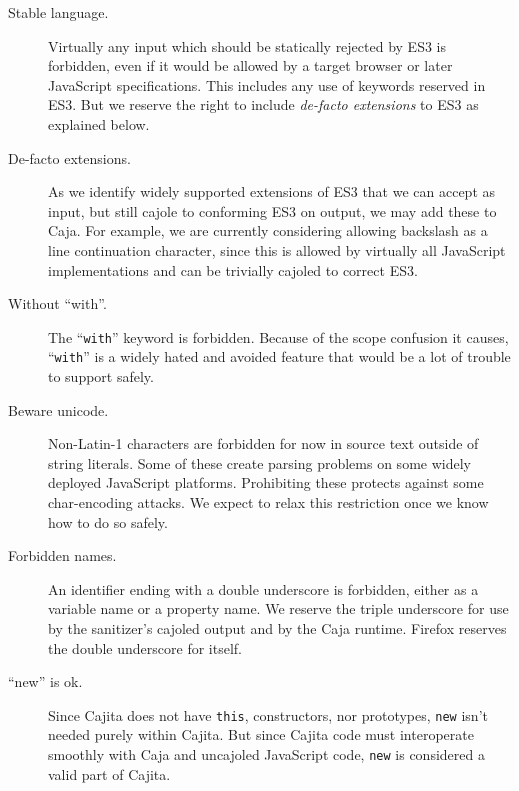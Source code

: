 \documentclass[letterpaper,twocolumn,10pt]{article}
\newcommand{\code}[1]{{\tt {#1}}}              %
\begin{document}
\begin{description}

    \item[Stable language.] Virtually any input which should be statically 
    rejected by ES3 is forbidden, even if it would be allowed by a target 
    browser or later JavaScript specifications. This includes any use of 
    keywords reserved in ES3. But we reserve the right to include 
    \emph{de-facto extensions} to ES3 as explained below.
    
    \item[De-facto extensions.] As we identify widely supported extensions of 
    ES3 that we can accept as input, but still cajole to conforming ES3 on 
    output, we may add these to Caja. For example, we are currently 
    considering allowing backslash as a line continuation character, since 
    this is allowed by virtually all JavaScript implementations and can be 
    trivially cajoled to correct ES3.

    \item[Without ``with''.] The ``\code{with}'' keyword is forbidden. 
    Because of the scope confusion it causes, ``\code{with}'' is a widely 
    hated and avoided feature that would be a lot of trouble to support 
    safely.

    \item[Beware unicode.] Non-Latin-1 characters are forbidden for now in 
    source text outside of string literals. Some of these create parsing 
    problems on some widely deployed JavaScript platforms. Prohibiting these 
    protects against some char-encoding attacks. We expect to relax this 
    restriction once we know how to do so safely.

    \item[Forbidden names.] An identifier ending with a double underscore is 
    forbidden, either as a variable name or a property name. We reserve the 
    triple underscore for use by the sanitizer's cajoled output and by the 
    Caja runtime. Firefox reserves the double underscore for itself.
    
    \item[``new'' is ok.] Since Cajita does not have \code{this}, 
    constructors, nor prototypes, \code{new} isn't needed purely within 
    Cajita. But since Cajita code must interoperate smoothly with Caja and 
    uncajoled JavaScript code, \code{new} is considered a valid part of 
    Cajita.
        
\end{description}
\end{document}
